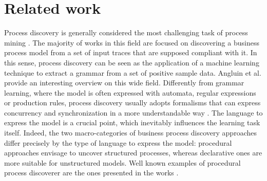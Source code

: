 
\section{Related work}
\label{sec:related}

Process discovery is generally considered the most challenging task of process mining \cite{2012-Maggi}. The majority of works in this field are focused on discovering a business process model from a set of input traces that are supposed compliant with it. In this sense, process discovery can be seen as the application of a machine learning technique to extract a grammar from a set of positive sample data. Angluin et al. \cite{1983-Angliun} provide an interesting overview on this wide field.
Differently from grammar learning, where the model is often expressed with automata, regular expressions or production rules, process discovery usually adopts formalisms that can express concurrency and synchronization in a more understandable way \cite{2009-Goedertier}. 
The language to express the model is a crucial point, which inevitably influences the learning task itself. Indeed, the two macro-categories of business process discovery approaches differ precisely by the type of language to express the model: procedural approaches envisage to uncover structured processes, whereas declarative ones are more suitable for unstructured models.
Well known examples of procedural process discoverer are the ones presented in the works \cite{2003-Weijters,2004-Aalst,2007-Gunther,2010-Aalst,2013-Leemans,2015-Guo,2017-Augusto, 2019-Augusto}. %
